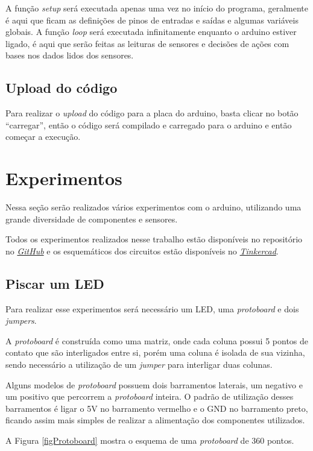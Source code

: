 \documentclass[12pt]{article}
\begin{document}
	A função \textit{setup} será executada apenas uma vez no início do programa, geralmente é aqui que ficam as definições de pinos de entradas e saídas e algumas variáveis globais.
	A função \textit{loop} será executada infinitamente enquanto o arduino estiver ligado, é aqui que serão feitas as leituras de sensores e decisões de ações com bases nos dados lidos dos sensores.

\subsection{Upload do código}
	Para realizar o \textit{upload} do código para a placa do arduino, basta clicar no botão ``carregar'', então o código será compilado e carregado para o arduino e então começar a execução.

\section{Experimentos}
	Nessa seção serão realizados vários experimentos com o arduino, utilizando uma grande diversidade de componentes e sensores.

	Todos os experimentos realizados nesse trabalho estão disponíveis no repositório no \href{https://github.com/ramires352/Arduino-UEM}{\textit{GitHub}} e os esquemáticos dos circuitos estão disponíveis no \href{https://www.tinkercad.com/users/8OFhdueEmAr-rrramires?category=circuits&sort=likes&view_mode=default}{\textit{Tinkercad}}.

\subsection{Piscar um LED}
	Para realizar esse experimentos será necessário um LED, uma \textit{protoboard} e dois \textit{jumpers}.

	A \textit{protoboard} é construída como uma matriz, onde cada coluna possui 5 pontos de contato que são interligados entre si, porém uma coluna é isolada de sua vizinha, sendo necessário a utilização de um \textit{jumper} para interligar duas colunas.

	Alguns modelos de \textit{protoboard} possuem dois barramentos laterais, um negativo e um positivo que percorrem a \textit{protoboard} inteira. O padrão de utilização desses barramentos é ligar o 5V no barramento vermelho e o GND no barramento preto, ficando assim mais simples de realizar a alimentação dos componentes utilizados.

	A Figura \ref{figProtoboard} mostra o esquema de uma \textit{protoboard} de 360 pontos.
\end{document}
